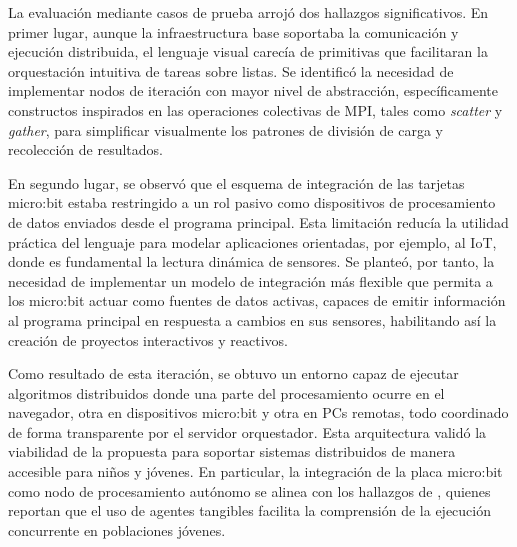 La evaluación mediante casos de prueba arrojó dos hallazgos significativos. En primer lugar, aunque la infraestructura base soportaba la comunicación y ejecución distribuida, el lenguaje visual carecía de primitivas que facilitaran la orquestación intuitiva de tareas sobre listas. Se identificó la necesidad de implementar nodos de iteración con mayor nivel de abstracción, específicamente constructos inspirados en las operaciones colectivas de MPI, tales como \textit{scatter} y \textit{gather}, para simplificar visualmente los patrones de división de carga y recolección de resultados.

En segundo lugar, se observó que el esquema de integración de las tarjetas micro:bit estaba restringido a un rol pasivo como dispositivos de procesamiento de datos enviados desde el programa principal. Esta limitación reducía la utilidad práctica del lenguaje para modelar aplicaciones orientadas, por ejemplo, al IoT, donde es fundamental la lectura dinámica de sensores. Se planteó, por tanto, la necesidad de implementar un modelo de integración más flexible que permita a los micro:bit actuar como fuentes de datos activas, capaces de emitir información al programa principal en respuesta a cambios en sus sensores, habilitando así la creación de proyectos interactivos y reactivos.

Como resultado de esta iteración, se obtuvo un entorno capaz de ejecutar algoritmos distribuidos donde una parte del procesamiento ocurre en el navegador, otra en dispositivos micro:bit y otra en PCs remotas, todo coordinado de forma transparente por el servidor orquestador. Esta arquitectura validó la viabilidad de la propuesta para soportar sistemas distribuidos de manera accesible para niños y jóvenes. En particular, la integración de la placa micro:bit como nodo de procesamiento autónomo se alinea con los hallazgos de , quienes reportan que el uso de agentes tangibles facilita la comprensión de la ejecución concurrente en poblaciones jóvenes.